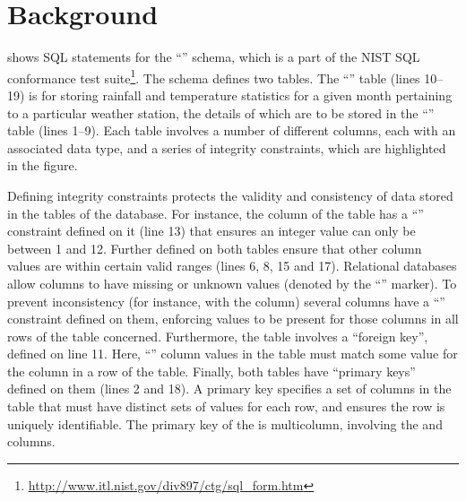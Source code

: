 
\vspace*{-1em}

\section{Background}
\label{sec:background}



 shows SQL  statements for the ``\NistWeather'' schema, which is a part of the NIST SQL conformance test suite\footnote{\small{\url{http://www.itl.nist.gov/div897/ctg/sql_form.htm}}}. The schema defines two tables. The ``'' table (lines 10--19) is for storing rainfall and temperature statistics for a given month pertaining to a particular weather station, the details of which are to be  stored in the ``'' table (lines 1--9). Each table involves a number of different columns, each with an associated data type, and a series of integrity constraints, which are highlighted in the figure.

Defining integrity constraints protects the validity and consistency of data stored in the tables of the database. For instance, the  column of the  table has a ``\CHECK'' constraint defined on it (line 13) that ensures an integer  value can only be between 1 and 12. Further \CCs defined on both tables ensure that other column values are within certain valid ranges (lines 6, 8, 15 and 17). Relational databases allow columns to have missing or unknown values (denoted by the ``\NULL'' marker). To prevent inconsistency (for instance, with the  column) several columns have a ``\NOTNULL'' constraint defined on them, enforcing values to be present for those columns in all rows of the table concerned.
Furthermore, the  table involves a ``foreign key'', defined on line 11. Here, ``'' column values in the  table must match some value
for the  column in a row of the  table. Finally, both tables have ``primary keys'' defined on them (lines 2 and 18). A primary key specifies a set of columns in the table that must have distinct sets of values for each row, and ensures the row is uniquely identifiable.
The primary key of the  is multicolumn, involving the  and  columns.

